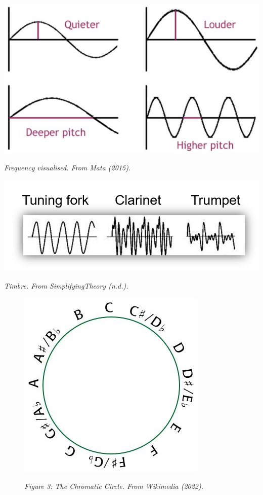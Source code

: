 \begin{center}
\includegraphics[scale=0.5]{./Images/Frequency.jpg}

{\it \footnotesize Frequency visualised. From Mata (2015).}
\end{center}


\begin{center}
\includegraphics[scale=0.6]{./Images/Timbre.jpeg}

{\it \footnotesize Timbre. From SimplifyingTheory (n.d.).}
\end{center}


\begin{figure}
\includegraphics[scale=0.35]{./Images/pitch.jpg}

{\it \footnotesize Figure 3: The Chromatic Circle. From Wikimedia (2022).}

\end{figure}

